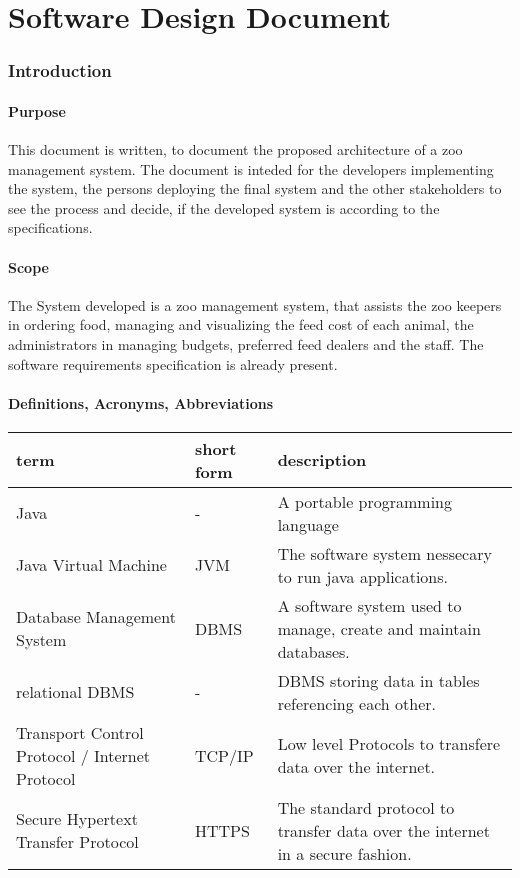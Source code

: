 \chapter{Software Design Document}

	\subsection{Introduction}
		\subsubsection{Purpose}
			This document is written, to document the proposed architecture of a zoo management system. The document is inteded for the developers implementing the system, the persons deploying the final system and the other stakeholders to see the process and decide, if the developed system is according to the specifications.
		\subsubsection{Scope}
			The System developed is a zoo management system, that assists the zoo keepers in ordering food, managing and visualizing the feed cost of each animal, the administrators in managing budgets, preferred feed dealers and the staff. The software requirements specification is already present.
		\subsubsection{Definitions, Acronyms, Abbreviations}
			\begin{tabular}{|p{}|p{}|p{}|}
				\hline
			\textbf{term}&\textbf{short form}&\textbf{description}\\
				\hline
				Java&-&A portable programming language\\
				\hline
				Java Virtual Machine&JVM&The software system nessecary to run java applications.\\
				\hline
				Database Management System&DBMS&A software system used to manage, create and maintain databases.\\
				\hline
				relational DBMS&-&DBMS storing data in tables referencing each other.\\
				\hline
				Transport Control Protocol / Internet Protocol&TCP/IP&Low level Protocols to transfere data over the internet.\\
				\hline
				Secure Hypertext Transfer Protocol&HTTPS&The standard protocol to transfer data over the internet in a secure fashion.\\
				\hline

			\end{tabular}

